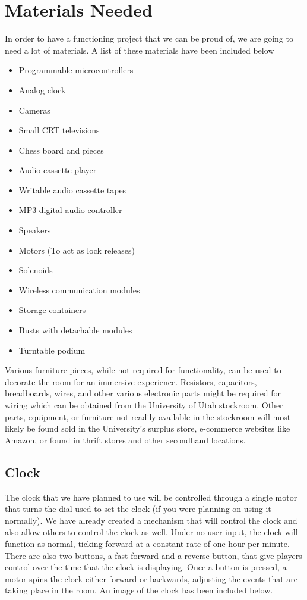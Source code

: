 \documentclass[conference]{IEEEtran}
\begin{document}
\section{Materials Needed}
In order to have a functioning project that we can be proud of, we are going to need a lot of materials.
A list of these materials have been included below
\begin{itemize}
    \item Programmable microcontrollers
    \item Analog clock
    \item Cameras
    \item Small CRT televisions
    \item Chess board and pieces
    \item Audio cassette player
    \item Writable audio cassette tapes
    \item MP3 digital audio controller
    \item Speakers
    \item Motors (To act as lock releases)
    \item Solenoids
    \item Wireless communication modules
    \item Storage containers
    \item Busts with detachable modules
    \item Turntable podium
\end{itemize}

Various furniture pieces, while not required for functionality, can be used to decorate
the room for an immersive experience. Resistors, capacitors, breadboards, wires, and other
various electronic parts might be required for wiring which can be obtained from the University
of Utah stockroom. Other parts, equipment, or furniture not readily available in the stockroom
will most likely be found sold in the University's surplus store, e-commerce websites like
Amazon, or found in thrift stores and other secondhand locations.

\subsection*{Clock}
The clock that we have planned to use will be controlled through a single motor that turns the
dial used to set the clock (if you were planning on using it normally). We have already created
a mechanism that will control the clock and also allow others to control the clock as well. Under
no user input, the clock will function as normal, ticking forward at a constant rate of one hour per
minute. There are also two buttons, a fast-forward and a reverse button, that give players control
over the time that the clock is displaying. Once a button is pressed, a motor spins the clock
either forward or backwards, adjusting the events that are taking place in the room. An image of
the clock has been included below.
\end{document}
